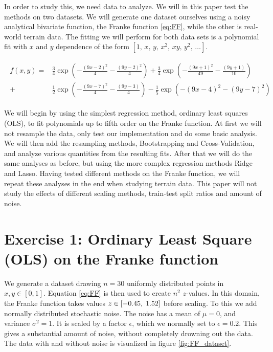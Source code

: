 \documentclass[reprint,english,notitlepage,aps,nobalancelastpage,nofootinbib]{revtex4-1}  %
\begin{document}
In order to study this, we need data to analyze. We will in this paper test the methods on two datasets. We will generate one dataset ourselves using a noisy analytical bivariate function, the Franke function \eqref{eq:FF}, while the other is real-world terrain data. The fitting we will perform for both data sets is a polynomial fit with $x$ and $y$ dependence of the form $[1,\,x,\,y,\,x^2,\,xy,\,y^2,\,\dots]$.

\begin{align}
	\begin{split}\label{eq:FF}
		f(x,y) = &\frac{3}{4}\exp(-\frac{(9x -2)^2}{4} - \frac{(9y-2)^2}{4}) + \frac{3}{4}\exp(-\frac{(9x + 1)^2}{49} - \frac{(9y + 1)}{10})
		\\
		+ &\frac{1}{2}\exp(-\frac{(9x-7)^2}{4} - \frac{(9y -3)}{4}) - \frac{1}{5}\exp(-(9x-4)^2 - (9y-7)^2)
	\end{split}
\end{align}

We will begin by using the simplest regression method, ordinary least squares (OLS), to fit polynomials up to fifth order on the Franke function. At first we will not resample the data, only test our implementation and do some basic analysis. We will then add the resampling methods, Bootstrapping and Cross-Validation, and analyze various quantities from the resulting fits. After that we will do the same analyses as before, but using the more complex regression methods Ridge and Lasso. Having tested different methods on the Franke function, we will repeat these analyses in the end when studying terrain data. This paper will not study the effects of different scaling methods, train-test split ratios and amount of noise.

\section*{Exercise 1: Ordinary Least Square (OLS) on the Franke function}

We generate a dataset drawing $n=30$ uniformly distributed points in $x, y \in[0, 1]$. Equation \eqref{eq:FF} is then used to create $n^2$ \(z\)-values. In this domain, the Franke function takes values \(z\in[-0.45, \hspace{1mm} 1.52]\) before scaling. To this we add normally distributed stochastic noise. The noise has a mean of $\mu=0$, and variance $\sigma^2=1$. It is scaled by a factor $\epsilon$, which we normally set to $\epsilon=0.2$. This gives a substantial amount of noise, without completely drowning out the data. The data with and without noise is visualized in figure \ref{fig:FF_dataset}.
\end{document}

